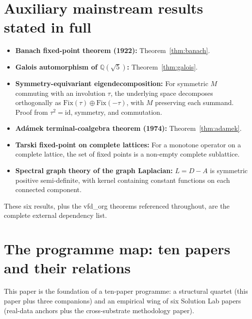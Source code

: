 \documentclass[11pt]{article}
\theoremstyle{plain}
\theoremstyle{definition}
\theoremstyle{remark}
\newcommand{\Fix}{\mathrm{Fix}}
\begin{document}
\section{Auxiliary mainstream results stated in full}\label{app:mainstream}

\begin{itemize}[leftmargin=2em]
\item \textbf{Banach fixed-point theorem (1922):} Theorem~\ref{thm:banach}.
\item \textbf{Galois automorphism of $\mathbb{Q}(\sqrt{5})$:} Theorem~\ref{thm:galois}.
\item \textbf{Symmetry-equivariant eigendecomposition:} For symmetric $M$ commuting with an involution $\tau$, the underlying space decomposes orthogonally as $\Fix(\tau) \oplus \Fix(-\tau)$, with $M$ preserving each summand. Proof from $\tau^2 = \mathrm{id}$, symmetry, and commutation.
\item \textbf{Adámek terminal-coalgebra theorem (1974):} Theorem~\ref{thm:adamek}.
\item \textbf{Tarski fixed-point on complete lattices:} For a monotone operator on a complete lattice, the set of fixed points is a non-empty complete sublattice.
\item \textbf{Spectral graph theory of the graph Laplacian:} $L = D - A$ is symmetric positive semi-definite, with kernel containing constant functions on each connected component.
\end{itemize}

These six results, plus the vfd\_org theorems referenced throughout, are the complete external dependency list.

\section{The programme map: ten papers and their relations}\label{sec:programme-map}

This paper is the foundation of a ten-paper programme: a structural quartet (this paper plus three companions) and an empirical wing of six Solution Lab papers (real-data anchors plus the cross-substrate methodology paper).
\end{document}
